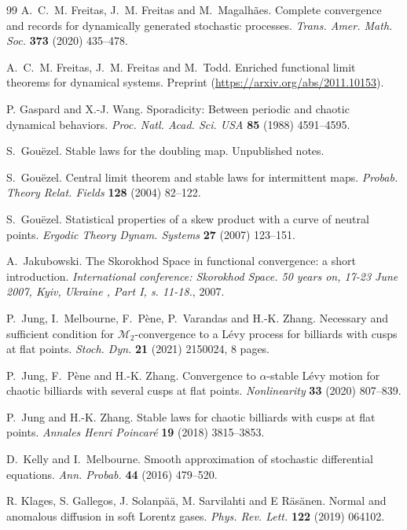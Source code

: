 \documentclass[12pt]{article}
\numberwithin{equation}{section}
\newcommand{\cM}{{\mathcal M}}
\begin{document}
\begin{thebibliography}{99}
A.~C.~M. Freitas, J.~M. Freitas and M.~Magalh\~{a}es. Complete convergence and
  records for dynamically generated stochastic processes. \emph{Trans. Amer.
  Math. Soc.} \textbf{373} (2020) 435--478.

A.~C.~M. Freitas, J.~M. Freitas and M.~Todd. Enriched functional limit
  theorems for dynamical systems. Preprint
(\url{https://arxiv.org/abs/2011.10153}).

  P. Gaspard and X.-J. Wang.
Sporadicity: Between periodic and chaotic dynamical behaviors.
\emph{Proc. Natl. Acad. Sci. USA} \textbf{85} (1988) 4591--4595.

S.~Gou{\"e}zel. Stable laws for the doubling map. Unpublished notes.

S.~Gou{\"e}zel. {Central limit theorem and stable laws for intermittent maps}.
  \emph{Probab. Theory Relat. Fields} \textbf{128} (2004) 82--122.

S.~Gou{\"e}zel. {Statistical properties of a skew product with a curve of
  neutral points}. \emph{Ergodic Theory Dynam. Systems} \textbf{27} (2007)
  123--151.

A.~Jakubowski. The Skorokhod Space in functional convergence: a short
  introduction. \emph{International conference: Skorokhod Space. 50 years on,
  17-23 June 2007, Kyiv, Ukraine , Part I, s. 11-18.}, 2007.

P.~Jung, I.~Melbourne, F.~P\`ene, P.~Varandas and H.-K. Zhang. Necessary and
  sufficient condition for $\cM_2$-convergence to a L\'evy process for
  billiards with cusps at flat points. \emph{Stoch. Dyn.} \textbf{21} (2021)
  2150024, 8 pages.

P.~Jung, F.~P\`ene and H.-K. Zhang. Convergence to {$\alpha$}-stable
  {L}\'{e}vy motion for chaotic billiards with several cusps at flat points.
  \emph{Nonlinearity} \textbf{33} (2020) 807--839.

P.~Jung and H.-K. Zhang. Stable laws for chaotic billiards with cusps at flat
  points. \emph{Annales Henri Poincar\'e} \textbf{19} (2018) 3815--3853.

D.~Kelly and I.~Melbourne. {Smooth approximation of stochastic differential
  equations}. \emph{Ann. Probab.} \textbf{44} (2016) 479--520.

 R. Klages, S. Gallegos, J. Solanp\"a\"a, M. Sarvilahti and
E R\"as\"anen.  Normal and anomalous diffusion in soft Lorentz gases.
\emph{Phys. Rev. Lett.} \textbf{122} (2019) 064102.


\end{thebibliography}
\end{document}
